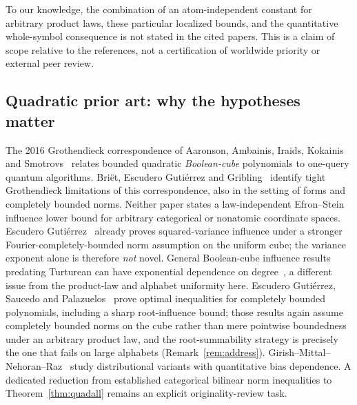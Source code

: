 \documentclass[11pt]{article}
\numberwithin{equation}{section}
\theoremstyle{remark}
\begin{document}
To our knowledge, the combination of an atom-independent constant for arbitrary product laws, these particular localized bounds, and the quantitative whole-symbol consequence is not stated in the cited papers. This is a claim of scope relative to the references, not a certification of worldwide priority or external peer review.

\subsection*{Quadratic prior art: why the hypotheses matter}
The 2016 Grothendieck correspondence of Aaronson, Ambainis, Iraids, Kokainis and Smotrovs~\cite{AAIKS16} relates bounded quadratic \emph{Boolean-cube} polynomials to one-query quantum algorithms. Bri\"et, Escudero Guti\'errez and Gribling~\cite{BEG24} identify tight Grothendieck limitations of this correspondence, also in the setting of forms and completely bounded norms. Neither paper states a law-independent Efron--Stein influence lower bound for arbitrary categorical or nonatomic coordinate spaces. Escudero Guti\'errez~\cite[Theorem~1.6]{EG23} already proves squared-variance influence under a stronger Fourier-completely-bounded norm assumption on the uniform cube; the variance exponent alone is therefore \emph{not} novel. General Boolean-cube influence results predating Turturean can have exponential dependence on degree~\cite{Tur26}, a different issue from the product-law and alphabet uniformity here. Escudero Guti\'errez, Saucedo and Palazuelos~\cite{ESP26} prove optimal inequalities for completely bounded polynomials, including a sharp root-influence bound; those results again assume completely bounded norms on the cube rather than mere pointwise boundedness under an arbitrary product law, and the root-summability strategy is precisely the one that fails on large alphabets (Remark~\ref{rem:address}). Girish--Mittal--Nehoran--Raz~\cite{GMNR26} study distributional variants with quantitative bias dependence. A dedicated reduction from established categorical bilinear norm inequalities to Theorem~\ref{thm:quadall} remains an explicit originality-review task.
\end{document}
